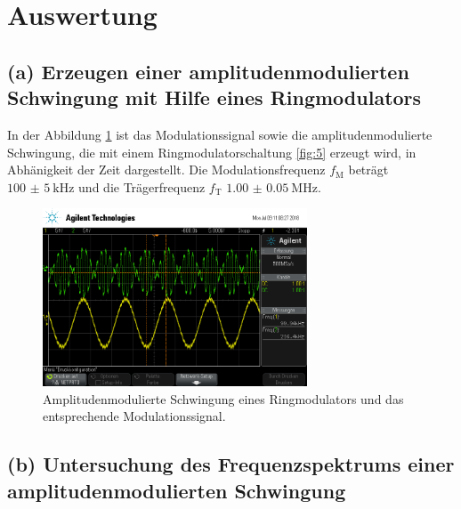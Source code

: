 \newpage
\section{Auswertung}
\label{sec:Auswertung}


\subsection{(a) Erzeugen einer amplitudenmodulierten Schwingung mit
Hilfe eines Ringmodulators}
\label{subsec:auswertung_a}
In der Abbildung \ref{fig:ringamp_zeit} ist das Modulationssignal
sowie die amplitudenmodulierte Schwingung, die mit einem Ringmodulatorschaltung \ref{fig:5}
erzeugt wird,
in Abhänigkeit der Zeit dargestellt.
Die Modulationsfrequenz $f_{\text{M}}$ beträgt $\SI{100(5)}{\kilo\hertz}$
und die Trägerfrequenz $f_{\text{T}}$ $\SI{1.00(5)}{\mega\hertz}$.

\begin{figure}
  \centering
  \includegraphics[width=0.7\textwidth]{osci/amp_ringmodulator.png}
  \caption{Amplitudenmodulierte
  Schwingung eines Ringmodulators und das entsprechende Modulationssignal.}
  \label{fig:ringamp_zeit}
\end{figure}

\FloatBarrier
\subsection{(b) Untersuchung des Frequenzspektrums einer
amplitudenmodulierten Schwingung}
\label{subsec:auswertung_b}

